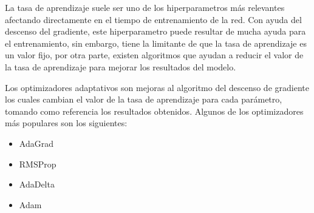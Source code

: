 La tasa de aprendizaje suele ser uno de los hiperparametros más relevantes afectando directamente en el tiempo de entrenamiento de la red. Con ayuda del descenso del gradiente, este hiperparametro puede resultar de mucha ayuda para el entrenamiento, sin embargo, tiene la limitante de que la tasa de aprendizaje es un valor fijo, por otra parte, existen algoritmos que ayudan a reducir el valor de la tasa de aprendizaje para mejorar los resultados del modelo.

Los optimizadores adaptativos son mejoras al algoritmo del descenso de gradiente los cuales cambian el valor de la tasa de aprendizaje para cada parámetro, tomando como referencia los resultados obtenidos. Algunos de los optimizadores más populares son los siguientes:

\begin{itemize}
    \item AdaGrad
    \item RMSProp
    \item AdaDelta
    \item Adam
\end{itemize}
